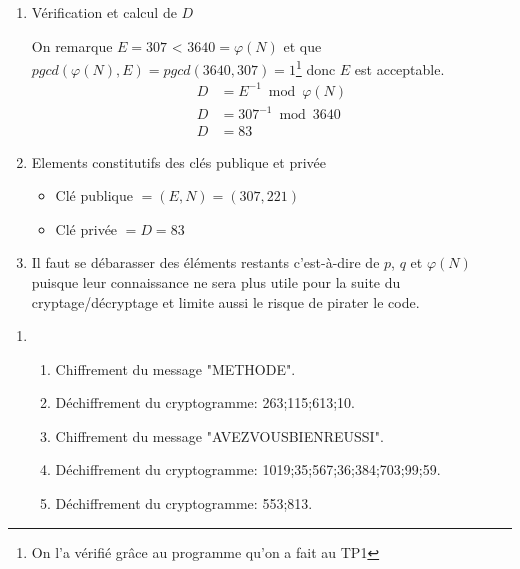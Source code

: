 \documentclass{homework}
\begin{document}
\begin{enumerate}
\begin{enumerate}
    			
    			\item Vérification et calcul de $D$
    			
    			On remarque $E = 307$ < $3640 = \varphi(N)$ et que $pgcd(\varphi(N),E) = pgcd(3640,307) = 1$\footnote[1]{On l'a vérifié grâce au programme qu'on a fait au TP1} donc $E$ est acceptable.
    				\begin{equation*}
    					\begin{split}    				
    				D & = E^{-1} \bmod \varphi(N) \\
   					D & = 307^{-1} \bmod 3640 \\
   					D & = 83
    					\end{split}
    				\end{equation*}
    				
    			\item Elements constitutifs des clés publique et privée
    				\begin{itemize}
    					\item Clé publique $= (E,N) = (307,221)$
    					\item Clé privée $= D = 83$
    				\end{itemize}
    			
    			
    			\item Il faut se débarasser des éléments restants c'est-à-dire de $p$, $q$ et $\varphi(N)$ puisque leur connaissance ne sera plus utile pour la suite du cryptage/décryptage et limite aussi le risque de pirater le code.
   			\end{enumerate}
		\end{enumerate}

	\exercise
		\begin{enumerate}
			\item 
				\begin{enumerate}
					\item Chiffrement du message "METHODE".
					
					\item Déchiffrement du cryptogramme: 263;115;613;10.
					
					\item Chiffrement du message "AVEZVOUSBIENREUSSI".
					
					\item Déchiffrement du cryptogramme: 1019;35;567;36;384;703;99;59.
					
					\item Déchiffrement du cryptogramme: 553;813.
				\end{enumerate}
		\end{enumerate}
\end{document}
